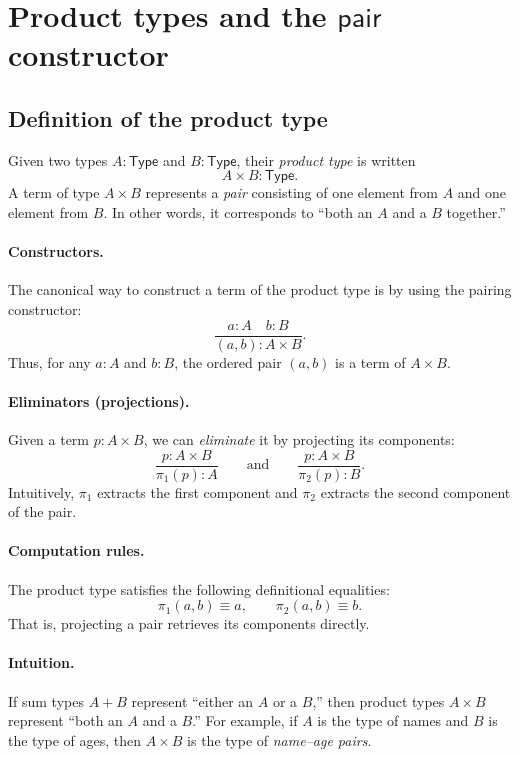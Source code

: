 \documentclass{article}
\newcommand{\Type}{\ensuremath{\mathsf{Type}}}
\newcommand{\jdeq}{\equiv}                 %
\begin{document}
\section{Product types and the \texorpdfstring{$\mathsf{pair}$}{pair} constructor}

\subsection*{Definition of the product type}

Given two types \(A : \Type\) and \(B : \Type\), their \emph{product type} is written
\[
A \times B : \Type.
\]
A term of type \(A \times B\) represents a \emph{pair} consisting of one element from \(A\) and one element from \(B\).  
In other words, it corresponds to “both an \(A\) and a \(B\) together.”

\paragraph{Constructors.}
The canonical way to construct a term of the product type is by using the pairing constructor:
\[
\frac{a : A \quad b : B}{(a, b) : A \times B}.
\]
Thus, for any \(a : A\) and \(b : B\), the ordered pair \((a, b)\) is a term of \(A \times B\).

\paragraph{Eliminators (projections).}
Given a term \(p : A \times B\), we can \emph{eliminate} it by projecting its components:
\[
\frac{p : A \times B}{\pi_1(p) : A}
\qquad\text{and}\qquad
\frac{p : A \times B}{\pi_2(p) : B}.
\]
Intuitively, \(\pi_1\) extracts the first component and \(\pi_2\) extracts the second component of the pair.

\paragraph{Computation rules.}
The product type satisfies the following definitional equalities:
\[
\pi_1(a,b) \jdeq a, \qquad \pi_2(a,b) \jdeq b.
\]
That is, projecting a pair retrieves its components directly.

\paragraph{Intuition.}
If sum types \(A + B\) represent “either an \(A\) or a \(B\),”  
then product types \(A \times B\) represent “both an \(A\) and a \(B\).”  
For example, if \(A\) is the type of names and \(B\) is the type of ages,  
then \(A \times B\) is the type of \emph{name–age pairs}.
\end{document}
